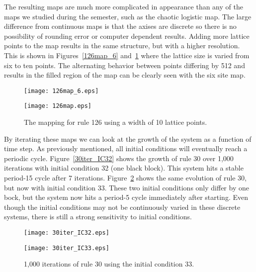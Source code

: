 The resulting maps are much more complicated in appearance than any of the maps we studied during the semester, such as the chaotic logistic map.  The large difference from continuous maps is that the axises are discrete so there is no possibility of rounding error or computer dependent results.  Adding more lattice points to the map results in the same structure, but with a higher resolution.  This is shown in Figures~\ref{126map_6} and~\ref{126map} where the lattice size is varied from six to ten points.  The alternating behavior between points differing by 512 and results in the filled region of the map can be clearly seen with the six site map.  

\begin{figure}
    \begin{minipage}[b]{0.49\textwidth}
        \centering
        \texttt{[image: 126map\_6.eps]}
        \caption{\label{126map_6} The mapping for rule 126 using a width of 6 lattice points.  }
    \end{minipage}
    \hspace{0.5cm}
    \begin{minipage}[b]{0.49\textwidth}
        \centering
        \texttt{[image: 126map.eps]}
        \caption{\label{126map} The mapping for rule 126 using a width of 10 lattice points.}
    \end{minipage}
\end{figure}

By iterating these maps we can look at the growth of the system as a function of time step.  As previously mentioned, all initial conditions will eventually reach a periodic cycle.  Figure~\ref{30iter_IC32} shows the growth of rule 30 over 1,000 iterations with initial condition 32 (one black block).  This system hits a stable period-15 cycle after 7 iterations.  Figure~\ref{30iter_IC33} shows the same evolution of rule 30, but now with initial condition 33.  These two initial conditions only differ by one bock, but the system now hits a period-5 cycle immediately after starting.  Even though the initial conditions may not be continuously varied in these discrete systems, there is still a strong sensitivity to initial conditions.  

\begin{figure}
    \begin{minipage}[b]{0.49\textwidth}
        \centering
        \texttt{[image: 30iter\_IC32.eps]}
        \caption{\label{30iter_IC32} 1,000 iterations of rule 30 with an initial condition of 32.   }
    \end{minipage}
    \hspace{0.5cm}
    \begin{minipage}[b]{0.49\textwidth}
        \centering
        \texttt{[image: 30iter\_IC33.eps]}
        \caption{\label{30iter_IC33} 1,000 iterations of rule 30 using the initial condition 33. }
    \end{minipage}
\end{figure}



